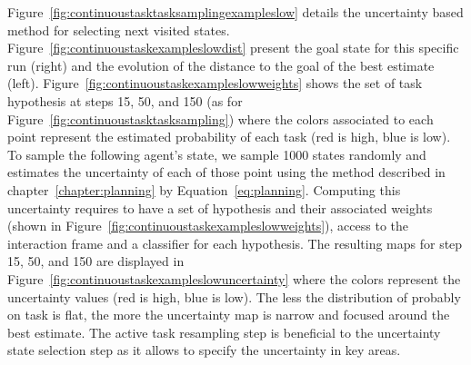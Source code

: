 Figure~\ref{fig:continuoustasktasksamplingexampleslow} details the uncertainty based method for selecting next visited states. Figure~\ref{fig:continuoustaskexampleslowdist} present the goal state for this specific run (right) and the evolution of the distance to the goal of the best estimate (left). Figure~\ref{fig:continuoustaskexampleslowweights} shows the set of task hypothesis at steps 15, 50, and 150 (as for Figure~\ref{fig:continuoustasktasksampling}) where the colors associated to each point represent the estimated probability of each task (red is high, blue is low). To sample the following agent's state, we sample 1000 states randomly and estimates the uncertainty of each of those point using the method described in chapter~\ref{chapter:planning} by Equation~\ref{eq:planning}. Computing this uncertainty requires to have a set of hypothesis and their associated weights (shown in Figure~\ref{fig:continuoustaskexampleslowweights}), access to the interaction frame and a classifier for each hypothesis. The resulting maps for step 15, 50, and 150 are displayed in Figure~\ref{fig:continuoustaskexampleslowuncertainty} where the colors represent the uncertainty values (red is high, blue is low). The less the distribution of probably on task is flat, the more the uncertainty map is narrow and focused around the best estimate. The active task resampling step is beneficial to the uncertainty state selection step as it allows to specify the uncertainty in key areas.

